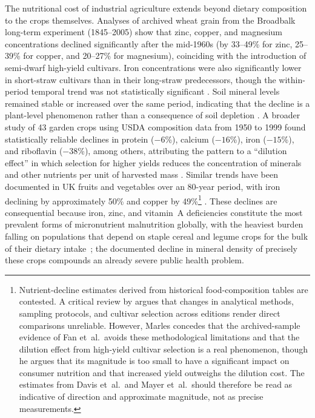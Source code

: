 The nutritional cost of industrial agriculture extends beyond dietary composition to the crops themselves. Analyses of archived wheat grain from the Broadbalk long-term experiment (1845--2005) show that zinc, copper, and magnesium concentrations declined significantly after the mid-1960s (by 33--49\% for zinc, 25--39\% for copper, and 20--27\% for magnesium), coinciding with the introduction of semi-dwarf high-yield cultivars. Iron concentrations were also significantly lower in short-straw cultivars than in their long-straw predecessors, though the within-period temporal trend was not statistically significant \cite[Tables~2,~4]{fan2008nutrient}. Soil mineral levels remained stable or increased over the same period, indicating that the decline is a plant-level phenomenon rather than a consequence of soil depletion \cite[p.~321]{fan2008nutrient}. A broader study of 43 garden crops using USDA composition data from 1950 to 1999 found statistically reliable declines in protein ($-6$\%), calcium ($-16$\%), iron ($-15$\%), and riboflavin ($-38$\%), among others, attributing the pattern to a ``dilution effect'' in which selection for higher yields reduces the concentration of minerals and other nutrients per unit of harvested mass \cite[Table~3]{davis2004changes}. Similar trends have been documented in UK fruits and vegetables over an 80-year period, with iron declining by approximately 50\% and copper by 49\%\footnote{Nutrient-decline estimates derived from historical food-composition tables are contested. A critical review by \textcite[Sections~3--4,~6--7]{marles2017mineral} argues that changes in analytical methods, sampling protocols, and cultivar selection across editions render direct comparisons unreliable. However, Marles concedes that the archived-sample evidence of Fan et~al.\ avoids these methodological limitations and that the dilution effect from high-yield cultivar selection is a real phenomenon, though he argues that its magnitude is too small to have a significant impact on consumer nutrition and that increased yield outweighs the dilution cost. The estimates from Davis et~al.\ and Mayer et~al.\ should therefore be read as indicative of direction and approximate magnitude, not as precise measurements.} \cite[Table~1]{mayer2022mineral}. These declines are consequential because iron, zinc, and vitamin~A deficiencies constitute the most prevalent forms of micronutrient malnutrition globally, with the heaviest burden falling on populations that depend on staple cereal and legume crops for the bulk of their dietary intake~\cite[pp.~353--354]{welch2004breeding}; the documented decline in mineral density of precisely these crops compounds an already severe public health problem.

